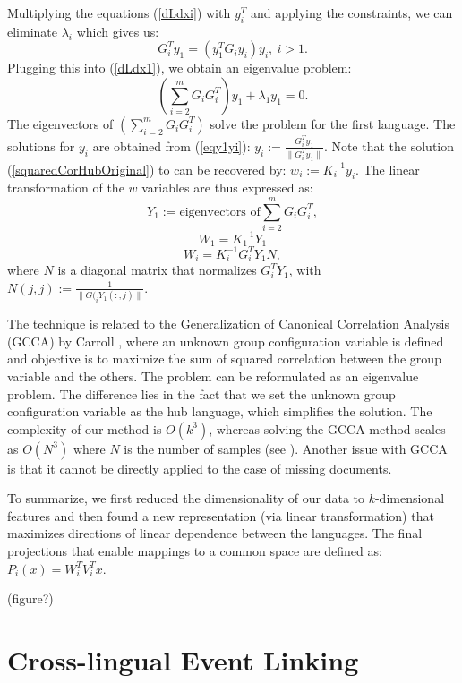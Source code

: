 \documentclass[twoside,11pt]{article}
\begin{document}
Multiplying the equations (\ref{dLdxi}) with $y_i^T$ and applying the constraints, we can eliminate $\lambda_i$ which gives us:
\begin{equation}\label{eqy1yi}
G_{i}^T y_1 = \left(y_1^T G_{i} y_i \right) y_i,~i > 1.
\end{equation}
Plugging this into (\ref{dLdx1}), we obtain an eigenvalue problem:
$$\left( \sum_{i = 2}^m G_i G_{i}^T \right) y_1 + \lambda_1 y_1 = 0.$$
The eigenvectors of $\left( \sum_{i = 2}^m G_i G_{i}^T \right)$ solve the problem for the first language. The solutions for $y_i$ are obtained from (\ref{eqy1yi}): $y_i := \frac{G_{i}^T y_1}{\| G_{i}^T y_1 \|}$.
Note that the solution (\ref{squaredCorHubOriginal}) to can be recovered by: $w_i := K_i^{-1} y_i$. The linear transformation of the $w$ variables are thus expressed as:
$$ Y_1 := \text{eigenvectors of} \sum_{i = 2}^m G_i G_{i}^T, $$
$$ W_1 = K_1^{-1} Y_1 $$
$$ W_i = K_i^{-1} G_{i}^T Y_1 N,$$
where $N$ is a diagonal matrix that normalizes $G_{i}^T Y_1$, with $N(j,j) := \frac{1}{\|G(_{i} Y_1(:,j)\|}$.

 The technique is related to the Generalization of Canonical Correlation Analysis (GCCA) by Carroll \citeyear{Carroll}, where an unknown group configuration variable is defined and objective is to maximize the sum of squared correlation between the group variable and the others. The problem can be reformulated as an eigenvalue problem. The difference lies in the fact that we set the unknown group configuration variable as the hub language, which simplifies the solution. The complexity of our method is $O(k^3)$, whereas solving the GCCA method scales as $O(N^3)$ where $N$ is the number of samples (see \cite{gifi}). Another issue with GCCA is that it cannot be directly applied to the case of missing documents.

To summarize, we first reduced the dimensionality of our data to $k$-dimensional features and then found a new representation (via linear transformation) that maximizes directions of linear dependence between the languages. The final projections that enable mappings to a common space are defined as: $P_i(x) = W_i^T V_i^T x.$

(figure?)


\section{Cross-lingual Event Linking}\label{sec:linking}
\end{document}
